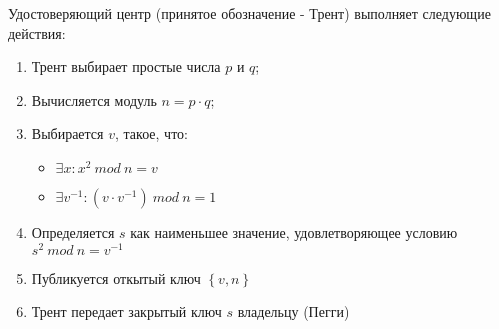 Удостоверяющий центр (принятое обозначение - Трент) выполняет следующие действия:

\begin{enumerate}

\item Трент выбирает простые числа $p$ и $q$;
\item Вычисляется модуль $n = p \cdot  q$;
\item Выбирается $v$, такое, что:
    \begin{itemize}

    \item $ \exists x: x^2 \ mod \ n = v$
    \item $ \exists v^{-1}: (v \cdot v^{-1}) \ mod \ n = 1$
    \end{itemize}

\item Определяется $s$ как наименьшее значение, удовлетворяющее условию
    $s^2 \ mod \ n = v^{-1}$

\item Публикуется откытый ключ $\left\{v,n\right\}$
\item Трент передает закрытый ключ $s$ владельцу (Пегги)

\end{enumerate}